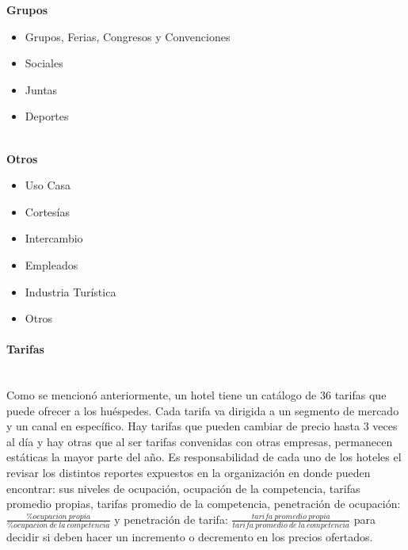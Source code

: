 \documentclass{article}\usepackage[]{graphicx}\usepackage[]{color}
\begin{document}
\textbf{Grupos}
\begin{itemize}[noitemsep]
\item Grupos, Ferias, Congresos y Convenciones
\item Sociales
\item Juntas
\item Deportes
\end{itemize}
~\\
\textbf{Otros}
\begin{itemize}[noitemsep]
\item Uso Casa
\item Cortesías
\item Intercambio
\item Empleados
\item Industria Turística
\item Otros
\end{itemize}
\paragraph{Tarifas}
~\\
Como se mencionó anteriormente, un hotel tiene un catálogo de 36 tarifas que puede ofrecer a los huéspedes. Cada tarifa va dirigida a un segmento de mercado y un canal en específico. Hay tarifas que pueden cambiar de precio hasta 3 veces al día y hay otras que al ser tarifas convenidas con otras empresas, permanecen estáticas la mayor parte del año.
Es responsabilidad de cada uno de los hoteles el revisar los distintos reportes expuestos en la organización en donde pueden encontrar: sus niveles de ocupación, ocupación de la competencia, tarifas promedio propias, tarifas promedio de la competencia, penetración de ocupación: $\frac{\% ocupacion\ propia}{ \% ocupacion\ de\ la\ competencia}$ y penetración de tarifa: $\frac{tarifa\ promedio\ propia}{tarifa\ promedio\ de\ la\ competencia}$ para decidir si deben hacer un incremento o decremento en los precios ofertados.
\end{document}
